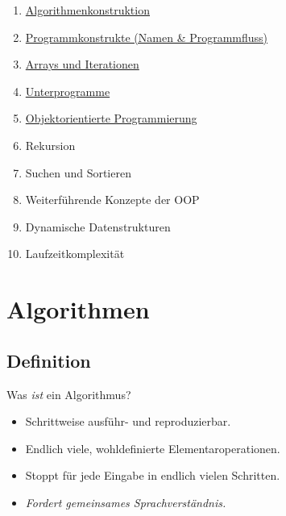 {\begin{frame}[c]{}
{\begin{enumerate}
   \item<3-> \hyperlink{btdl@section.1}{Algorithmenkonstruktion}
   \item<3-> \hyperlink{btdl@section.2}{Programmkonstrukte (Namen \& Programmfluss)}
   \item<3-> \hyperlink{btdl@section.3}{Arrays und Iterationen}
   \item<3-> \hyperlink{btdl@section.4}{Unterprogramme}
   \item<3-> \hyperlink{btdl@section.5}{Objektorientierte Programmierung}\bigskip
   \item<3->[\g 6.] \g Rekursion
   \item<3->[\g 7.] \g Suchen und Sortieren
   \item<3->[\g 8.] \g Weiterführende Konzepte der OOP
   \item<3->[\g 9.] \g Dynamische Datenstrukturen
   \item<3->[\g 10.] \g Laufzeitkomplexität
\end{enumerate}}%
\end{frame}
}
\fi

\section{Algorithmen}

\subsection{Definition}
\begin{frame}[c]{Was \textit{ist} ein Algorithmus?}
   \begin{center}
   \end{center}\vfill
\begin{itemize}
      \itemsep8pt
      \item<3-> Schrittweise ausführ- und reproduzierbar.
      \item<4-> Endlich viele, wohldefinierte Elementaroperationen.
      \item<5-> Stoppt für jede Eingabe in endlich vielen Schritten.\bigskip
      \item<6->[\color{gray}\defaultitemizeblock] {\color{gray}\itshape Fordert gemeinsames Sprachverständnis.}
\end{itemize}
\end{frame}


